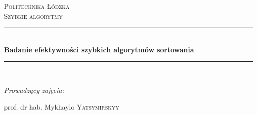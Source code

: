 \pgfplotsset{compat=newest} %


\setcounter{secnumdepth}{4}
\setcounter{tocdepth}{4}
\addto\captionsenglish{%
  \renewcommand{\contentsname}%
    {Spis treści}%
}




\begin{titlepage}

\newcommand{\HRule}{\rule{\linewidth}{0.5mm}} %

\center %
 

\textsc{\LARGE Politechnika Łódzka}\\[1.5cm] %
\textsc{\Large Szybkie algorytmy}\\[0.5cm] %


\HRule \\[0.4cm]
{ \huge \bfseries Badanie efektywności szybkich algorytmów sortowania  }\\[0.4cm] %
\HRule \\[1.5cm]
 



\begin{flushleft}\large

\begin{center} \emph{Prowadzący zajęcia:} \end{center}
\begin{center}
prof. dr hab. Mykhaylo \textsc{Yatsymirskyy}
\end{center} %
\end{flushleft}



\end{titlepage}
